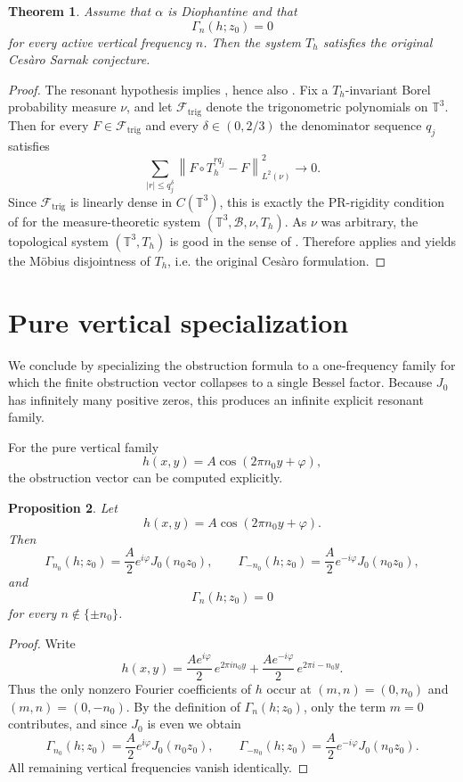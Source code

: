\documentclass[11pt,reqno]{amsart}
\newtheorem{theorem}{Theorem}[section]
\newtheorem{proposition}[theorem]{Proposition}
\theoremstyle{definition}
\newcommand{\T}{\mathbb{T}}
\newcommand{\e}[1]{e^{2\pi i #1}}
\newcommand{\norm}[1]{\left\lVert #1 \right\rVert}
\newcommand{\abs}[1]{\left\lvert #1 \right\rvert}
\newcommand{\qj}{q_j}
\begin{document}
\begin{theorem}\label{thm:mobius-resonant}
Assume that $\alpha$ is Diophantine and that
\[
\Gamma_n(h;z_0)=0
\]
for every active vertical frequency $n$. Then the system $T_h$ satisfies the original
Ces\`aro Sarnak conjecture.
\end{theorem}

\begin{proof}
The resonant hypothesis implies , hence also
. Fix a $T_h$-invariant Borel probability measure
$\nu$, and let $\mathcal F_{\mathrm{trig}}$ denote the trigonometric polynomials on $\T^3$.
Then for every $F\in \mathcal F_{\mathrm{trig}}$ and every $\delta\in(0,2/3)$ the denominator
sequence $\qj$ satisfies
\[
\sum_{\abs{r}\le \qj^\delta}
\norm{F\circ T_h^{r\qj}-F}_{L^2(\nu)}^2 \to 0.
\]
Since $\mathcal F_{\mathrm{trig}}$ is linearly dense in $C(\T^3)$, this is exactly the
PR-rigidity condition of \cite[Definition~1.1]{KLR} for the measure-theoretic system
$(\T^3,\mathcal B,\nu,T_h)$. As $\nu$ was arbitrary, the topological system $(\T^3,T_h)$ is
good in the sense of \cite[Definition~1.1]{KLR}. Therefore \cite[Theorem~1.1]{KLR} applies and
yields the M\"obius disjointness of $T_h$, i.e. the original Ces\`aro formulation.
\end{proof}

\section{Pure vertical specialization}\label{sec:flagship}

We conclude by specializing the obstruction formula to a one-frequency family for which the finite
obstruction vector collapses to a single Bessel factor. Because $J_0$ has infinitely many positive
zeros, this produces an infinite explicit resonant family.

For the pure vertical family
\[
h(x,y)=A\cos(2\pi n_0 y+\varphi),
\]
the obstruction vector can be computed explicitly.

\begin{proposition}\label{prop:pure-vertical}
Let
\[
h(x,y)=A\cos(2\pi n_0 y+\varphi).
\]
Then
\[
\Gamma_{n_0}(h;z_0)=\frac{A}{2}e^{i\varphi}J_0(n_0 z_0),
\qquad
\Gamma_{-n_0}(h;z_0)=\frac{A}{2}e^{-i\varphi}J_0(n_0 z_0),
\]
and
\[
\Gamma_n(h;z_0)=0
\]
for every $n\notin\{\pm n_0\}$.
\end{proposition}

\begin{proof}
Write
\[
h(x,y)
=
\frac{A e^{i\varphi}}{2}\,\e{n_0 y}
+
\frac{A e^{-i\varphi}}{2}\,\e{-n_0 y}.
\]
Thus the only nonzero Fourier coefficients of $h$ occur at $(m,n)=(0,n_0)$ and
$(m,n)=(0,-n_0)$. By the definition of $\Gamma_n(h;z_0)$, only the term $m=0$ contributes, and
since $J_0$ is even we obtain
\[
\Gamma_{n_0}(h;z_0)=\frac{A}{2}e^{i\varphi}J_0(n_0 z_0),
\qquad
\Gamma_{-n_0}(h;z_0)=\frac{A}{2}e^{-i\varphi}J_0(n_0 z_0).
\]
All remaining vertical frequencies vanish identically.
\end{proof}
\end{document}
